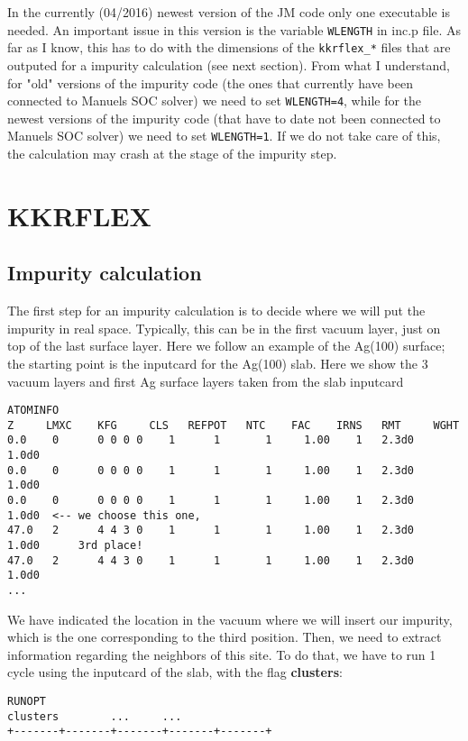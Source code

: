 \documentclass[11pt,fleqn]{book} %
\begin{document}
In the currently (04/2016) newest version of the JM code only one executable is needed.
An important issue in this version is the variable \verb|WLENGTH| in inc.p
file. As far as I know, this has to do with the dimensions of the
\verb|kkrflex_*| files that are outputed for a impurity calculation (see next section).
From what I understand, for "old" versions of the impurity code (the ones that currently
have been connected to Manuels SOC solver) we need to set \verb|WLENGTH=4|,
while for the newest versions of the impurity code (that have to date not been connected to
Manuels SOC solver) we need to set  \verb|WLENGTH=1|. If we do not take care of this,
the calculation may crash at the stage of the impurity step.


\chapter{KKRFLEX}

\section{Impurity calculation}
\label{sec:impurity}

The first step for an impurity calculation is to decide where we will put the
impurity in real space. Typically, this can be in the first vacuum layer,
just on top of the last surface layer. Here we follow an example
of the Ag(100) surface; the starting point is the
inputcard for the Ag(100) slab.
Here we show the 3 vacuum layers and first
Ag surface layers taken from the slab inputcard
\begin{VBox}
{\small{
\begin{verbatim}
ATOMINFO
Z     LMXC    KFG     CLS   REFPOT   NTC    FAC    IRNS   RMT     WGHT
0.0    0      0 0 0 0    1      1       1     1.00    1   2.3d0   1.0d0
0.0    0      0 0 0 0    1      1       1     1.00    1   2.3d0   1.0d0
0.0    0      0 0 0 0    1      1       1     1.00    1   2.3d0   1.0d0  <-- we choose this one,
47.0   2      4 4 3 0    1      1       1     1.00    1   2.3d0   1.0d0      3rd place!
47.0   2      4 4 3 0    1      1       1     1.00    1   2.3d0   1.0d0
...
\end{verbatim}
}}
\end{VBox}
We have indicated the location in the vacuum where we will insert our impurity,
which is the one corresponding to the third position.
Then, we need to extract information regarding the neighbors of this site.
To do that, we have to run 1 cycle using the inputcard of the slab,
with the flag \textbf{clusters}:
\begin{VBox}
\begin{verbatim}
RUNOPT
clusters        ...     ...
+-------+-------+-------+-------+-------+
\end{verbatim} 
\end{VBox}
\end{document}
